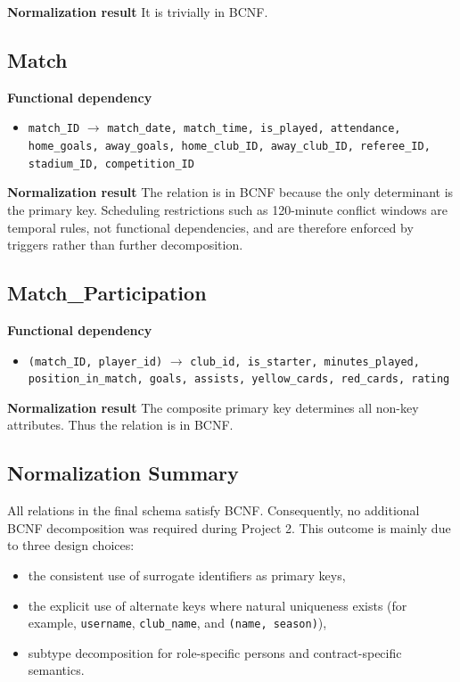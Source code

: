 \documentclass[12pt,a4paper]{article}
\begin{document}
\textbf{Normalization result} It is trivially in BCNF.

\subsection{Match}
\textbf{Functional dependency}
\begin{itemize}
    \item \texttt{match\_ID} $\rightarrow$ \texttt{match\_date, match\_time, is\_played, attendance, home\_goals, away\_goals, home\_club\_ID, away\_club\_ID, referee\_ID, stadium\_ID, competition\_ID}
\end{itemize}
\textbf{Normalization result} The relation is in BCNF because the only determinant is the primary key. Scheduling restrictions such as 120-minute conflict windows are temporal rules, not functional dependencies, and are therefore enforced by triggers rather than further decomposition.

\subsection{Match\_Participation}
\textbf{Functional dependency}
\begin{itemize}
    \item \texttt{(match\_ID, player\_id)} $\rightarrow$ \texttt{club\_id, is\_starter, minutes\_played, position\_in\_match, goals, assists, yellow\_cards, red\_cards, rating}
\end{itemize}
\textbf{Normalization result} The composite primary key determines all non-key attributes. Thus the relation is in BCNF.

\subsection{Normalization Summary}
All relations in the final schema satisfy BCNF. Consequently, no additional BCNF decomposition was required during Project 2. This outcome is mainly due to three design choices:
\begin{itemize}
    \item the consistent use of surrogate identifiers as primary keys,
    \item the explicit use of alternate keys where natural uniqueness exists (for example, \texttt{username}, \texttt{club\_name}, and \texttt{(name, season)}),
    \item subtype decomposition for role-specific persons and contract-specific semantics.
\end{itemize}
\end{document}
